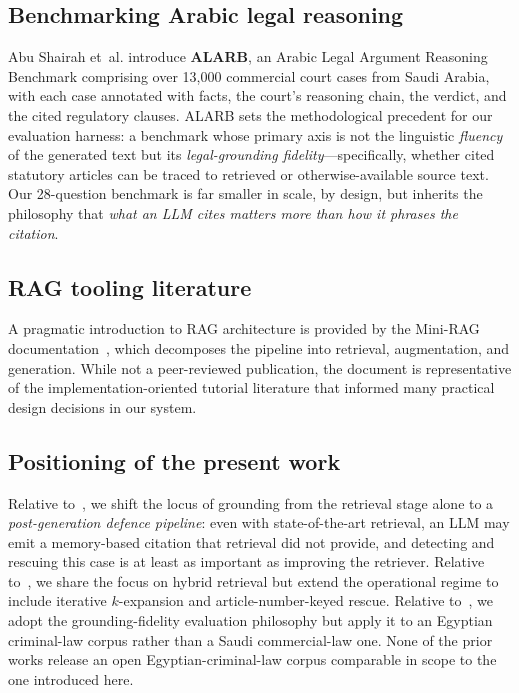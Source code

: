 \documentclass[final,1p,times]{elsarticle}
\begin{document}
\subsection{Benchmarking Arabic legal reasoning}

Abu Shairah et~al.\cite{alarb2025} introduce \textbf{ALARB}, an Arabic Legal
Argument Reasoning Benchmark comprising over 13{,}000 commercial court cases
from Saudi Arabia, with each case annotated with facts, the court's reasoning
chain, the verdict, and the cited regulatory clauses. ALARB sets the
methodological precedent for our evaluation harness: a benchmark whose
primary axis is not the linguistic \emph{fluency} of the generated text but
its \emph{legal-grounding fidelity}---specifically, whether cited statutory
articles can be traced to retrieved or otherwise-available source text. Our
28-question benchmark is far smaller in scale, by design, but inherits the
philosophy that \emph{what an LLM cites matters more than how it phrases the
citation}.

\subsection{RAG tooling literature}

A pragmatic introduction to RAG architecture is provided by the Mini-RAG
documentation~\cite{miniraq}, which decomposes the pipeline into retrieval,
augmentation, and generation. While not a peer-reviewed publication, the
document is representative of the implementation-oriented tutorial literature
that informed many practical design decisions in our system.

\subsection{Positioning of the present work}

Relative to~\cite{elbeltagy2024,hrimech2025}, we shift the locus of grounding
from the retrieval stage alone to a \emph{post-generation defence pipeline}:
even with state-of-the-art retrieval, an LLM may emit a memory-based citation
that retrieval did not provide, and detecting and rescuing this case is at
least as important as improving the retriever. Relative
to~\cite{alghamdi2023,aboasal2025}, we share the focus on hybrid retrieval
but extend the operational regime to include iterative $k$-expansion and
article-number-keyed rescue. Relative to~\cite{alarb2025}, we adopt the
grounding-fidelity evaluation philosophy but apply it to an Egyptian
criminal-law corpus rather than a Saudi commercial-law one. None of the
prior works release an open Egyptian-criminal-law corpus comparable in scope
to the one introduced here.
\end{document}
